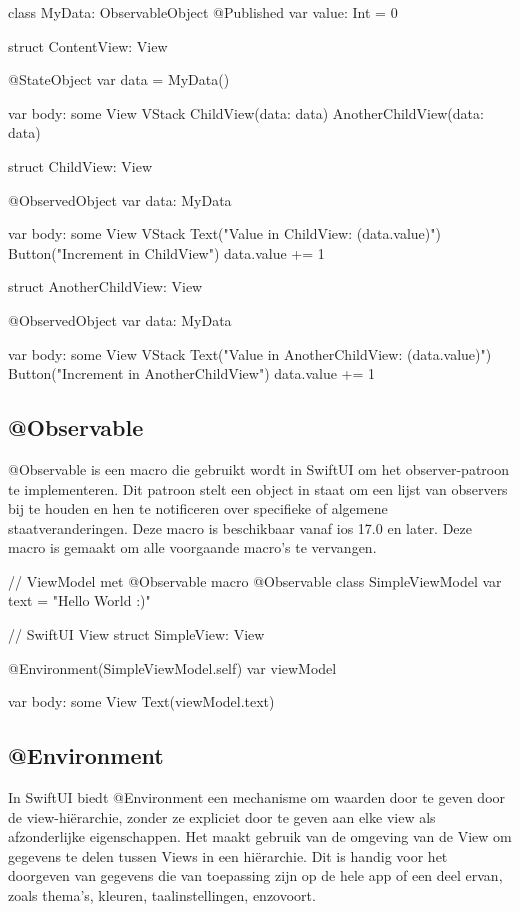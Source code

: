 \begin{swift}[caption=Example of StateObject, label=stateobject_example]
class MyData: ObservableObject {
    @Published var value: Int = 0
}

struct ContentView: View {
    @StateObject var data = MyData()
    
    var body: some View {
        VStack {
            ChildView(data: data)
            AnotherChildView(data: data)
        }
    }
}

struct ChildView: View {
    @ObservedObject var data: MyData
    
    var body: some View {
        VStack {
            Text("Value in ChildView: (data.value)")
            Button("Increment in ChildView") {
                data.value += 1
            }
        }
    }
}
struct AnotherChildView: View {
    @ObservedObject var data: MyData
    
    var body: some View {
        VStack {
            Text("Value in AnotherChildView: (data.value)")
            Button("Increment in AnotherChildView") {
                data.value += 1
            }
        }
    }
}

\end{swift}

\subsection{@Observable}
\autocite{AppleObservable} @Observable is een macro die gebruikt wordt in SwiftUI om het observer-patroon te implementeren. Dit patroon stelt een object in staat om een lijst van observers bij te houden en hen te notificeren over specifieke of algemene staatveranderingen. Deze macro is beschikbaar vanaf ios 17.0 en later. Deze macro is gemaakt om alle voorgaande macro's te vervangen.

\begin{swift}[caption=Example of Observable, label=Observable_example]
// ViewModel met @Observable macro
@Observable class SimpleViewModel {
    var text = "Hello World :)"
}

// SwiftUI View
struct SimpleView: View {
    @Environment(SimpleViewModel.self) var viewModel
    
    var body: some View {
        Text(viewModel.text)
    }
}
\end{swift}


\subsection{@Environment}
\autocite{AppleEnvironment} In SwiftUI biedt @Environment een mechanisme om waarden door te geven door de view-hiërarchie, zonder ze expliciet door te geven aan elke view als afzonderlijke eigenschappen. Het maakt gebruik van de omgeving van de View om gegevens te delen tussen Views in een hiërarchie. Dit is handig voor het doorgeven van gegevens die van toepassing zijn op de hele app of een deel ervan, zoals thema's, kleuren, taalinstellingen, enzovoort.


